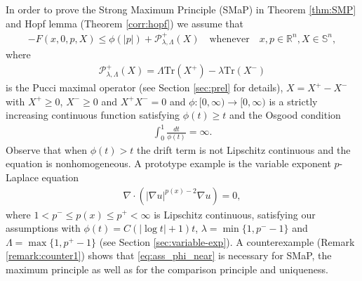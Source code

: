 \documentclass[12pt]{article}
\newcommand{\red}{\color{red}}
\newcounter{komcounter}
\numberwithin{komcounter}{section}
\newcommand{\komN}[1]{{\bf \red [\refstepcounter{komcounter}\thekomcounter (by N): #1]}}
\begin{document}

In order to prove the Strong Maximum Principle (SMaP) in Theorem \ref{thm:SMP} and Hopf lemma (Theorem \ref{corr:hopf}) we assume that
%
\begin{align}\label{eq:ass_drift_super}
-F(x,0,p,X) \leq \phi(|p|) + \mathcal{P}^+_{\lambda,\Lambda}(X) \quad \text{whenever} \quad x, p \in \mathbb{R}^n, X \in \mathbb{S}^n,
\tag{$F_2 A$}
\end{align}
%
where
%
\begin{align*}%
\mathcal{P}^+_{\lambda,\Lambda}(X) = \Lambda \text{Tr}(X^+) - \lambda \text{Tr}(X^-)
\end{align*}
%
is the Pucci maximal operator (see Section \ref{sec:prel} for details),
$X = X^+ - X^-$ with $X^+ \geq 0$, $X^- \geq 0$ and $X^+  X^- = 0$ and $\phi : [0,\infty) \to [0,\infty)$ is a strictly increasing continuous function satisfying $\phi(t) \geq t$ and the Osgood condition
%
\begin{align}\label{eq:ass_phi_near}
\int_{0}^{1} \frac{dt}{\phi(t)} = \infty.
\tag{$\phi_A$}
\end{align}
%
Observe that when $\phi(t) > t$ the drift term is not Lipschitz continuous and the equation is nonhomogeneous.
A prototype example is the variable exponent $p$-Laplace equation
%
\begin{align*}
\nabla \cdot \left( |\nabla u|^{p(x)-2} \nabla u\right) = 0,
\end{align*}
%
where $1 < p^- \leq p(x) \leq p^+< \infty$ is Lipschitz continuous, satisfying our assumptions with $\phi(t) = C \left(|\log t| + 1\right) t$, $\lambda = \min\{ 1, p^{-} - 1\}$ and $\Lambda = \max\{ 1, p^{+} - 1\}$ (see Section \ref{sec:variable-exp}).
A counterexample (Remark \ref{remark:counter1}) shows that \eqref{eq:ass_phi_near} is necessary for SMaP, the maximum principle as well as for the comparison principle and uniqueness.
\end{document}
